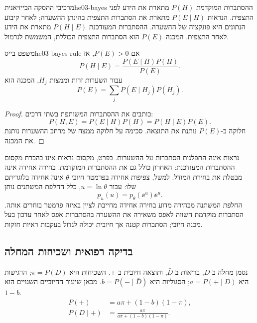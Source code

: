 \begin{definition}{מרכיבי ההסקה הבייזיאנית}{he03-bayes}
ההסתברות המוקדמת $P(H)$ מתארת את הידע לפני התצפית. הנראות $P(E\mid H)$ מתארת את הסתברות התצפית בהינתן ההשערה; לאחר קיבוע הנתונים היא פונקציה של ההשערה. ההסתברות המעודכנת $P(H\mid E)$ מתארת את הידע לאחר התצפית. המכנה $P(E)$ הוא הסתברות התצפית הכוללת, המשמשת לנרמול.
\end{definition}

\begin{theorem}{משפט בייס}{he03-bayes-rule}
אם $P(E)>0$, אז
\begin{equation}\label{eq:he03-bayes}
P(H\mid E)=\frac{P(E\mid H)P(H)}{P(E)}.
\end{equation}
עבור השערות זרות וממצות $H_j$, המכנה הוא
\begin{equation}\label{eq:he03-evidence}
P(E)=\sum_j P(E\mid H_j)P(H_j).
\end{equation}
\end{theorem}
\begin{proof}
כותבים את ההסתברות המשותפת בשתי דרכים:
\begin{equation}\label{eq:he03-joint}
P(H,E)=P(E\mid H)P(H)=P(H\mid E)P(E).
\end{equation}
חלוקה ב-$P(E)$ נותנת את התוצאה. סכימה על חלוקה ממצה של מרחב ההשערות נותנת את המכנה.
\end{proof}

נראות אינה התפלגות הסתברות על ההשערות. בפרט, מקסום נראות אינו בהכרח מקסום ההסתברות המעודכנת: האחרון כולל גם את ההסתברות המוקדמת. בחירה אחידה אינה מבטלת את בחירת המודל. למשל, צפיפות אחידה בפרמטר חיובי $\theta$ אינה אחידה בלוגריתם שלו: עבור $u=\ln\theta$, כלל החלפת המשתנים נותן
\begin{equation}\label{eq:he03-prior-transform}
p_u(u)=p_\theta(\ee^u)\ee^u.
\end{equation}
החלפת המשתנה מבהירה מדוע בחירה אחידה מחייבת לציין באיזה פרמטר בוחרים אותה. הסתברות מוקדמת השווה לאפס משאירה את ההשערה בהסתברות אפס לאחר עדכון בעל מכנה חיובי; הסתברות קטנה אך חיובית יכולה לגדול בעקבות ראיות חזקות.

\subsection{בדיקה רפואית ושכיחות המחלה}\label{sec:he03-test}
נסמן מחלה ב-$D$, בריאות ב-$\bar D$, ותוצאה חיובית ב-$+$. השכיחות היא $\pi=P(D)$; הרגישות היא $a=P(+\mid D)$; הסגוליות היא $b=P(-\mid\bar D)$. מכאן שיעור החיוביים השגויים הוא $1-b$.
\begin{align}
P(+)&=a\pi+(1-b)(1-\pi),\label{eq:he03-positive}\\
P(D\mid+)&=\frac{a\pi}{a\pi+(1-b)(1-\pi)}.\label{eq:he03-ppv}
\end{align}


